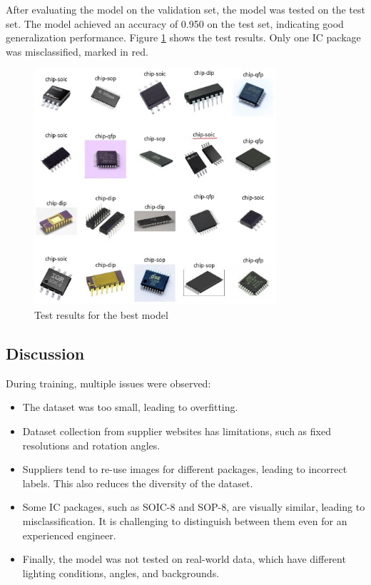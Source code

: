 \documentclass[preprint,12pt,3p,times]{elsarticle}
\begin{document}
\vspace{0.5cm}
After evaluating the model on the validation set, the model was tested on the test set. The model achieved an accuracy of 0.950 on the test set, indicating good generalization performance. Figure \ref{fig:test} shows the test results. Only one IC package was misclassified, marked in red.

\begin{figure}[H]
	\centering
	\includegraphics[width=0.8\textwidth]{images/test.jpg}
	\caption{Test results for the best model}
	\label{fig:test}
\end{figure}

\subsection{Discussion}
During training, multiple issues were observed:
\begin{itemize}
	\item The dataset was too small, leading to overfitting.
	\item Dataset collection from supplier websites has limitations, such as fixed resolutions and rotation angles.
	\item Suppliers tend to re-use images for different packages, leading to incorrect labels. This also reduces the diversity of the dataset.
	\item Some IC packages, such as SOIC-8 and SOP-8, are visually similar, leading to misclassification. It is challenging to distinguish between them even for an experienced engineer.
	\item Finally, the model was not tested on real-world data, which have different lighting conditions, angles, and backgrounds.
\end{itemize}
\end{document}
